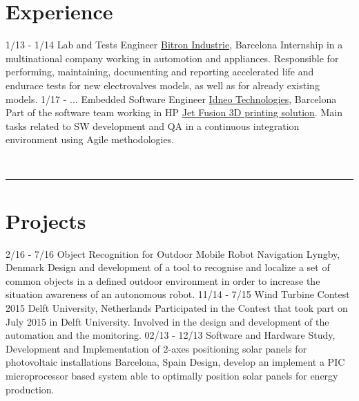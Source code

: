 \documentclass[]{friggeri-cv}
\begin{document}
\section{Experience}
\begin{entrylist}
\entry
    {1/13 - 1/14}
    {Lab and Tests Engineer}
    {\href{http://www.bitron.net/}{Bitron Industrie}, Barcelona}
    {Internship in a multinational company working in automotion and appliances. Responsible for performing, maintaining, documenting and reporting accelerated life and endurace tests for new electrovalves models, as well as for already existing models.}
\entry
    {1/17 - ...}
    {Embedded Software Engineer}
    {\href{http://www.idneo.com/}{Idneo Technologies}, Barcelona}
    {Part of the software team working in HP  \href{http://www8.hp.com/us/en/printers/3d-printers.html}{Jet Fusion 3D printing solution}. Main tasks related to SW development and QA in a continuous integration environment using Agile methodologies.}
\end{entrylist}
\vspace{1cm}\\
\textcolor{gray}{\rule{\textwidth}{1.5pt}}\vspace*{0.2cm}
\section{Projects}
\begin{entrylist}
 \entry
    {2/16 - 7/16}
    {Object Recognition for Outdoor Mobile Robot Navigation}
    {Lyngby, Denmark}
    {Design and development of a tool to recognise and localize a set of common objects in a defined outdoor environment in order to increase the situation awareness of an autonomous robot.\vspace*{0.05cm}}
 \entry
    {11/14 - 7/15}
    {Wind Turbine Contest 2015}
    {Delft University, Netherlands}
    {Participated in the Contest that took part on July 2015 in Delft University. Involved in the design and development of the automation and the monitoring. \vspace*{0.05cm}}
 \entry
    {02/13 - 12/13}
    {Software and Hardware Study, Development and Implementation of 2-axes positioning solar panels for photovoltaic installations}
    {Barcelona, Spain}
    {Design, develop an implement a PIC microprocessor based system able to optimally position solar panels for energy production.\vspace*{0.05cm}}
  
\end{entrylist}
\end{document}
